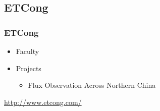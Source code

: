 \documentclass{beamer}
\begin{document}
\begin{CJK}{UTF8}{gkai}
{  
  
 
  
  \section{ETCong}
  \frame
  {
  \frametitle{ETCong}
  \begin{itemize}
  \item Faculty
  \item Projects
    \begin{itemize}
    \item Flux Observation Across Northern China
    \end{itemize}
  \end{itemize}
  \url{http://www.etcong.com/}
  }
}
\end{CJK}
\end{document}
